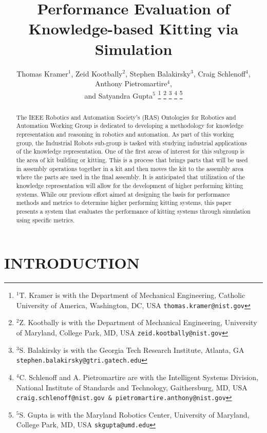\documentclass[letterpaper, 10 pt, conference]{ieeeconf}  %
\title{\LARGE \bf
Performance Evaluation of Knowledge-based Kitting via Simulation
}
\author{Thomas Kramer$^{1}$, Zeid Kootbally$^{2}$, Stephen Balakirsky$^{3}$, Craig Schlenoff$^{4}$, Anthony Pietromartire$^{4}$, \\ and Satyandra Gupta$^{5}$%
\thanks{$^{1}$T. Kramer is with the Department of Mechanical Engineering, Catholic University of America, Washington, DC, USA
        {\tt\small thomas.kramer@nist.gov}}%
\thanks{$^{2}$Z. Kootbally is with the Department of Mechanical Engineering, University of Maryland, College Park, MD, USA
        {\tt\small zeid.kootbally@nist.gov}}
\thanks{$^{3}$S. Balakirsky is with the Georgia Tech Research Institute, Atlanta, GA
{\tt\small stephen.balakirsky@gtri.gatech.edu}}%
\thanks{$^{4}$C. Schlenoff and A. Pietromartire are with the Intelligent Systems Division,
National Institute of Standards and Technology, Gaithersburg, MD, USA
{\tt\small craig.schlenoff@nist.gov \& pietromartire.anthony@nist.gov}}%
\thanks{$^{5}$S. Gupta is with the Maryland Robotics Center, University of Maryland,
College Park, MD, USA
        {\tt\small skgupta@umd.edu}}%
}
\begin{document}
\maketitle
\thispagestyle{empty}
\pagestyle{empty}


\begin{abstract}

The IEEE Robotics and Automation Society's (RAS) Ontologies for Robotics
and Automation Working Group is dedicated to developing a methodology for
knowledge representation and reasoning in robotics and automation. As part
of this working group, the Industrial Robots sub-group is tasked with
studying industrial applications of the knowledge representation. One of
the first areas of interest for this subgroup is the area of kit building
or kitting. This is a process that brings parts that will be used in
assembly operations together in a kit and then moves the kit to the
assembly area where the parts are used in the final assembly. It is
anticipated that utilization of the knowledge representation will allow for
the development of higher performing kitting systems. While our previous
effort aimed at designing the basis for performance methods and metrics to
determine higher performing kitting systems, this paper presents a system
that evaluates the performance of kitting systems through simulation using
specific metrics.

\end{abstract}



\section{INTRODUCTION} 
\label{sect:Introduction}



\end{document}
